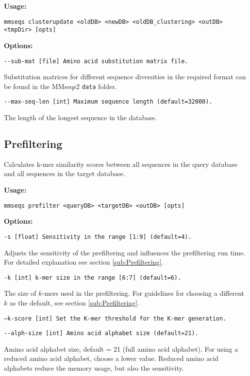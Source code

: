 \documentclass[11pt,a4paper]{scrreprt}
\begin{document}
\textbf{Usage:}


\texttt{mmseqs clusterupdate <oldDB> <newDB> <oldDB\_clustering> <outDB> <tmpDir> {[}opts{]}}


\textbf{Options:}


\texttt{\small -{}-sub-mat {[}file{]} Amino acid substitution matrix file.}{\small \par}


Substitution matrices for different sequence diversities in the required format can be found in the MMseqs2 \texttt{data} folder.


\texttt{\small -{}-max-seq-len {[}int{]} Maximum sequence length (default=32000).}{\small \par}


The length of the longest sequence in the database.
\subsection{Prefiltering}
Calculates k-mer similarity scores between all sequences in the query database and all sequences in the target database.


\textbf{Usage:}


\texttt{mmseqs prefilter <queryDB> <targetDB> <outDB> {[}opts{]}}


\textbf{Options:}


\texttt{\small -s {[}float{]} Sensitivity in the range {[}1:9{]} (default=4).}{\small \par}


Adjusts the sensitivity of the prefiltering and influences the prefiltering run time. For detailed explanation see section \ref{sub:Prefiltering}.


\texttt{\small -k {[}int{]} k-mer size in the range {[}6:7{]} (default=6).}{\small \par}


The size of $k$-mers used in the prefiltering. For guidelines for choosing a different $k$ as the default, see section \ref{sub:Prefiltering}.


\texttt{\small --k-score {[}int{]}  Set the K-mer threshold for the K-mer generation.}{\small \par}


\texttt{\small -{}-alph-size {[}int{]} Amino acid alphabet size (default=21).}{\small \par}


Amino acid alphabet size, default = 21 (full amino acid alphabet). For using a reduced amino acid alphabet, choose a lower value. Reduced amino acid alphabets reduce the memory usage, but also the sensitivity.
\end{document}
